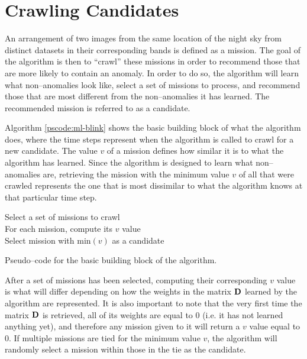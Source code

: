 \section{Crawling Candidates} \label{sect:meth:intro}

An arrangement of two images from the same location of the night sky from distinct datasets in their corresponding bands is defined as a mission. The goal of the \mlblink algorithm is then to ``crawl'' these missions in order to recommend those that are more likely to contain an anomaly. In order to do so, the \mlblink algorithm will learn what non--anomalies look like,  select a set of missions to process, and recommend those that are most different from the non--anomalies it has learned. The recommended mission is referred to as a candidate.  \newline

Algorithm \ref{pscode:ml-blink} shows the basic building block of what the \mlblink algorithm does, where the time steps represent when the algorithm is called to crawl for a new candidate. The value $v$ of a mission defines how similar it is to what the \mlblink algorithm has learned. Since the \mlblink algorithm is designed to learn what non--anomalies are, retrieving the mission with the minimum value $v$ of all that were crawled represents the one that is most dissimilar to what the \mlblink algorithm knows at that particular time step.

\vspace{0.4cm}
\begin{algorithm}[H]
    \SetAlgoLined
        \FMain{} {
             {
                Select a set of missions to crawl \\
                For each mission, compute its $v$ value \\
                Select mission with $\text{min}(v)$ as a candidate \\
            }
        }
    \caption{Pseudo--code for the basic building block of the \mlblink algorithm.}
    \label{pscode:ml-blink}
\end{algorithm}
\vspace{0.4cm}

After a set of missions has been selected, computing their corresponding $v$ value is what will differ depending on how the weights in the matrix $\boldsymbol{\mathbf{D}}$ learned by the algorithm are represented. It is also important to note that the very first time the matrix $\boldsymbol{\mathbf{D}}$ is retrieved, all of its weights are equal to $0$ (i.e. it has not learned anything yet), and therefore any mission given to it will return a $v$ value equal to $0$. If multiple missions are tied for the minimum value $v$, the \mlblink algorithm will randomly select a mission within those in the tie as the candidate.
